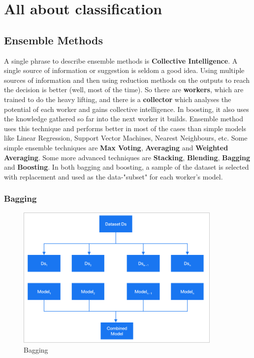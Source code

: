 
\chapter{All about classification} %

\label{Chapter6} %


\section{Ensemble Methods}

A single phrase to describe ensemble methods is \textbf{Collective Intelligence}. A single source of information or suggestion is seldom a good idea. Using multiple sources of information and then using reduction methods on the outputs to reach the decision is better (well, most of the time). So there are \textbf{workers}, which are trained to do the heavy lifting, and there is a \textbf{collector} which analyses the potential of each worker and gains collective intelligence. In boosting, it also uses the knowledge gathered so far into the next worker it builds. Ensemble method uses this technique and performs better in most of the cases than simple models like Linear Regression, Support Vector Machines, Nearest Neighbours, etc. Some simple ensemble techniques are \textbf{Max Voting}, \textbf{Averaging} and \textbf{Weighted Averaging}. Some more advanced techniques are \textbf{Stacking}, \textbf{Blending}, \textbf{Bagging} and \textbf{Boosting}. In both bagging and boosting, a sample of the dataset is selected with replacement and used as the data-"subset" for each worker's model.

\subsection{Bagging}

\begin{figure}[H]
\centering
\includegraphics[height=7cm]{Figures/bagging.png}
\caption{Bagging}
\label{fig23}
\end{figure}

